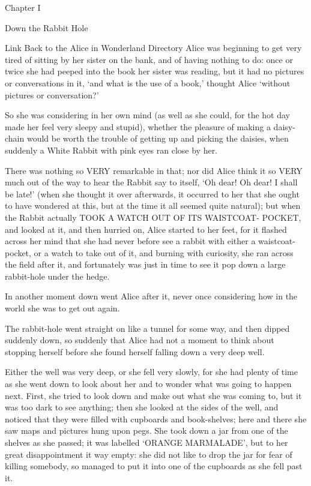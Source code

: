 \documentclass{article}
\begin{document}
\huge
Chapter I

Down the Rabbit Hole

Link Back to the Alice in Wonderland Directory
Alice was beginning to get very tired of sitting by her sister on the bank, and of having nothing to do: once or twice she had peeped into the book her sister was reading, but it had no pictures or conversations in it, `and what is the use of a book,' thought Alice `without pictures or conversation?'

So she was considering in her own mind (as well as she could, for the hot day made her feel very sleepy and stupid), whether the pleasure of making a daisy-chain would be worth the trouble of getting up and picking the daisies, when suddenly a White Rabbit with pink eyes ran close by her.

There was nothing so VERY remarkable in that; nor did Alice think it so VERY much out of the way to hear the Rabbit say to itself, `Oh dear! Oh dear! I shall be late!' (when she thought it over afterwards, it occurred to her that she ought to have wondered at this, but at the time it all seemed quite natural); but when the Rabbit actually TOOK A WATCH OUT OF ITS WAISTCOAT- POCKET, and looked at it, and then hurried on, Alice started to her feet, for it flashed across her mind that she had never before see a rabbit with either a waistcoat-pocket, or a watch to take out of it, and burning with curiosity, she ran across the field after it, and fortunately was just in time to see it pop down a large rabbit-hole under the hedge.

In another moment down went Alice after it, never once considering how in the world she was to get out again.

The rabbit-hole went straight on like a tunnel for some way, and then dipped suddenly down, so suddenly that Alice had not a moment to think about stopping herself before she found herself falling down a very deep well.

Either the well was very deep, or she fell very slowly, for she had plenty of time as she went down to look about her and to wonder what was going to happen next. First, she tried to look down and make out what she was coming to, but it was too dark to see anything; then she looked at the sides of the well, and noticed that they were filled with cupboards and book-shelves; here and there she saw maps and pictures hung upon pegs. She took down a jar from one of the shelves as she passed; it was labelled `ORANGE MARMALADE', but to her great disappointment it way empty: she did not like to drop the jar for fear of killing somebody, so managed to put it into one of the cupboards as she fell past it.
\end{document}
